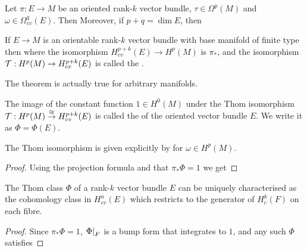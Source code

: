 \documentclass{article}
\begin{document}
\begin{prop}
Let $\pi:E \to M$ be an oriented rank-$k$ vector bundle, $\tau \in \Omega^p(M)$ and $\omega \in \Omega^q_{cv}(E)$. Then 
\eq{
\pi_\ast \pround{(\pi^\ast \tau) \wedge \omega} = \tau \wedge \pi_\ast \omega
}
Moreover, if $p+q=\dim E$, then 
\end{prop}

\begin{theorem}
	If $E \to M$ is an orientable rank-$k$ vector bundle with base manifold of finite type then 
where the isomorphism $H^{p+k}_{cv}(E) \to H^{p}(M)$ is $\pi_\ast$, and the isomorphism $\mathcal{T}:H^p(M) \to H^{p+k}_{cv}(E)$ is called the . 
\end{theorem}

\begin{remark}
	The theorem is actually true for arbitrary manifolds. 
\end{remark}

\begin{definition}
	The image of the constant function $1 \in H^0(M)$ under the Thom isomorphism $\mathcal{T} : H^p(M) \overset{\cong}{\to} H^{p+k}_{cv}(E)$ is called the  of the oriented vector bundle $E$. We write it as $\Phi = \Phi(E)$. 
\end{definition}

\begin{lemma}
The Thom isomorphism is given explicitly by 
for $\omega \in H^p(M)$.
\end{lemma}
\begin{proof}
	Using the projection formula and that $\pi_\ast \Phi =1$ we get 
	\eq{
\pi_\ast \pround{(\pi^\ast \omega)\wedge \Phi} = \omega \wedge \pi_\ast \Phi = \omega	
}
\end{proof}

\begin{prop}
	The Thom class $\Phi$ of a rank-$k$ vector bundle $E$ can be uniquely characterised as the cohomology class in $H_{cv}^n(E)$ which restricts to the generator of $H_c^k(F)$ on each fibre. 
\end{prop}
\begin{proof}
	Since $\pi_\ast \Phi =1$, $\left. \Phi \right\rvert_{F}$ is a bump form that integrates to $1$, and any such $\Phi$ satisfies 
	\eq{
\pi_\ast \pround{(\pi^\ast \omega)\wedge \Phi} = \omega \wedge \pi_\ast \Phi = \omega	
}
\end{proof}
\end{document}
